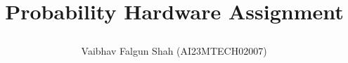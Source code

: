 \documentclass[journal,12pt,twocolumn]{IEEEtran}
\DeclareMathOperator*{\Res}{Res}
\begin{document}
%


\newtheorem{theorem}{Theorem}[section]
\newtheorem{problem}{Problem}
\newtheorem{proposition}{Proposition}[section]
\newtheorem{lemma}{Lemma}[section]
\newtheorem{corollary}[theorem]{Corollary}
\newtheorem{example}{Example}[section]
\newtheorem{definition}[problem]{Definition}

\newcommand{\BEQA}{\begin{eqnarray}}
\newcommand{\EEQA}{\end{eqnarray}}
\newcommand{\define}{\stackrel{\triangle}{=}}


\providecommand{\mbf}{\mathbf}
\providecommand{\pr}[1]{\ensuremath{\Pr\left(#1\right)}}
\providecommand{\qfunc}[1]{\ensuremath{Q\left(#1\right)}}
\providecommand{\sbrak}[1]{\ensuremath{{}\left[#1\right]}}
\providecommand{\lsbrak}[1]{\ensuremath{{}\left[#1\right.}}
\providecommand{\rsbrak}[1]{\ensuremath{{}\left.#1\right]}}
\providecommand{\brak}[1]{\ensuremath{\left(#1\right)}}
\providecommand{\lbrak}[1]{\ensuremath{\left(#1\right.}}
\providecommand{\rbrak}[1]{\ensuremath{\left.#1\right)}}
\providecommand{\cbrak}[1]{\ensuremath{\left\{#1\right\}}}
\providecommand{\lcbrak}[1]{\ensuremath{\left\{#1\right.}}
\providecommand{\rcbrak}[1]{\ensuremath{\left.#1\right\}}}
\theoremstyle{remark}
\newtheorem{rem}{Remark}
\newcommand{\sgn}{\mathop{\mathrm{sgn}}}
\providecommand{\abs}[1]{\left\vert#1\right\vert}
\providecommand{\res}[1]{\Res\displaylimits_{#1}} 
\providecommand{\norm}[1]{\left\lVert#1\right\rVert}

\providecommand{\mtx}[1]{\mathbf{#1}}
\providecommand{\mean}[1]{E\left[ #1 \right]}
\providecommand{\fourier}{\overset{\mathcal{F}}{ \rightleftharpoons}}

\providecommand{\system}{\overset{\mathcal{H}}{ \longleftrightarrow}}
 
\newcommand{\solution}{\noindent \textbf{Solution: }}
\newcommand{\cosec}{\,\text{cosec}\,}
\providecommand{\dec}[2]{\ensuremath{\overset{#1}{\underset{#2}{\gtrless}}}}
\newcommand{\myvec}[1]{\ensuremath{\begin{pmatrix}#1\end{pmatrix}}}
\newcommand{\mydet}[1]{\ensuremath{\begin{vmatrix}#1\end{vmatrix}}}

\let\vec\mathbf

\vspace{3cm}
\title{

Probability Hardware Assignment

}
\author{ Vaibhav Falgun Shah (AI23MTECH02007)$^{}$
} 
\end{document}
